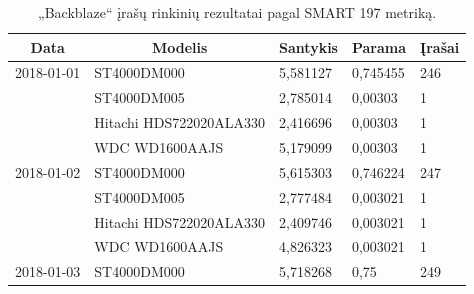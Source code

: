 \documentclass{VUMIFPSkursinis}
\begin{document}
\begin{table}[H]
\centering
\caption{„Backblaze“ įrašų rinkinių rezultatai pagal SMART 197 metriką.}
\label{tab:rez197}
{\begin{tabular}{|l|l|l|l|l|}
\hline
\multicolumn{1}{|c|}{\textbf{Data}} & \multicolumn{1}{c|}{\textbf{Modelis}} & \multicolumn{1}{c|}{\textbf{Santykis}} & \multicolumn{1}{c|}{\textbf{Parama}} & \multicolumn{1}{c|}{\textbf{Įrašai}} \\ \hline
2018-01-01                          & ST4000DM000                           & 5,581127                               & 0,745455                             & 246                                  \\ \hline
\cellcolor[HTML]{C0C0C0}            & ST4000DM005                           & 2,785014                               & 0,00303                              & 1                                    \\ \hline
\cellcolor[HTML]{C0C0C0}            & Hitachi HDS722020ALA330               & 2,416696                               & 0,00303                              & 1                                    \\ \hline
\cellcolor[HTML]{C0C0C0}            & WDC WD1600AAJS                        & 5,179099                               & 0,00303                              & 1                                    \\ \hline
2018-01-02                          & ST4000DM000                           & 5,615303                               & 0,746224                             & 247                                  \\ \hline
\cellcolor[HTML]{C0C0C0}            & ST4000DM005                           & 2,777484                               & 0,003021                             & 1                                    \\ \hline
\cellcolor[HTML]{C0C0C0}            & Hitachi HDS722020ALA330               & 2,409746                               & 0,003021                             & 1                                    \\ \hline
\cellcolor[HTML]{C0C0C0}            & WDC WD1600AAJS                        & 4,826323                               & 0,003021                             & 1                                    \\ \hline
2018-01-03                          & ST4000DM000                           & 5,718268                               & 0,75                                 & 249                                  \\ \hline

\end{tabular}}
\end{table}
\end{document}
